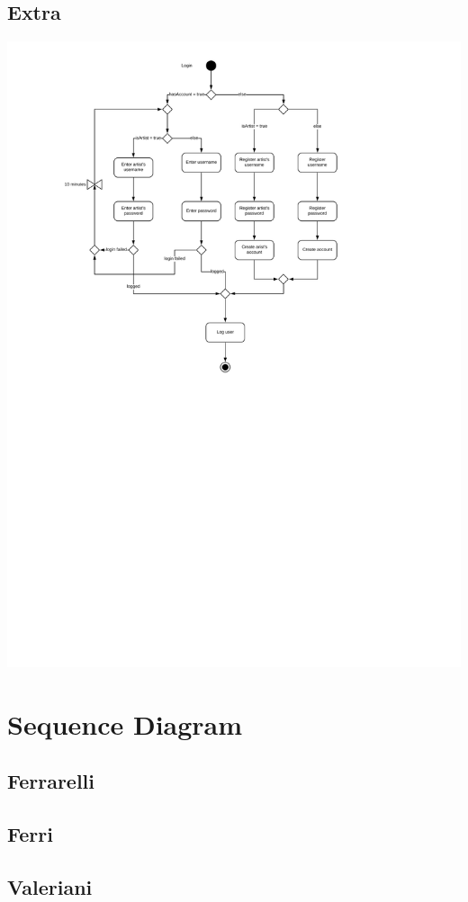 \documentclass[11pt,a4paper]{article}
\begin{document}
\subsection{Extra}
\includegraphics[scale=0.5]{logActivityDiagram.jpg}
\section{Sequence Diagram}
\subsection{Ferrarelli}
\subsection{Ferri}
\subsection{Valeriani}
\end{document}
